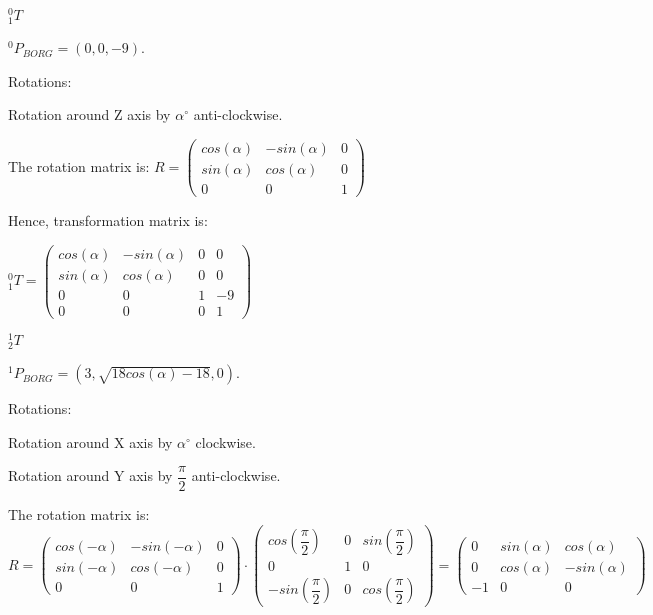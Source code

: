 \documentclass[12pt]{article}
\begin{document}
\begin{list}{)~}{}
\item
$_{1}^{0}T$

$^0 P_{BORG} = \left(0, 0, -9\right)$.

Rotations:

\begin{list}{)~}{}
\item
Rotation around Z axis by $\alpha^\circ$ anti-clockwise.
\end{list}

The rotation matrix is:
$R=\left(\begin{array}{ccc}
cos\left(\alpha\right) & -sin\left(\alpha\right) & 0 \\
sin\left(\alpha\right) & cos\left(\alpha\right) & 0\\
0 & 0 & 1\end{array}\right)$

Hence, transformation matrix is:

$_{1}^{0}T = \left(\begin{array}{cccc}
cos\left(\alpha\right) & - sin\left(\alpha\right) & 0 & 0 \\
sin\left(\alpha\right) & cos\left(\alpha\right) & 0 & 0\\
0 & 0 & 1 & -9\\
0 & 0 & 0 & 1\end{array}\right)$

\item
$_{2}^{1}T$

$^1 P_{BORG} = \left(3, \sqrt{18 cos(\alpha) - 18}, 0\right)$.

Rotations:

\begin{list}{)~}{}
\item Rotation around X axis by $\alpha^\circ$ clockwise.
\item Rotation around Y axis by $\dfrac{\pi}{2}$ anti-clockwise.
\end{list}

The rotation matrix is:
$R=\left(\begin{array}{ccc}
cos\left(-\alpha\right) & -sin\left(-\alpha\right) & 0 \\
sin\left(-\alpha\right) & cos\left(-\alpha\right) & 0\\
0 & 0 & 1\end{array}\right)\cdot
\left(\begin{array}{ccc}
cos \left(\dfrac{\pi}{2}\right) & 0 & sin \left(\dfrac{\pi}{2}\right) \\
0 & 1 & 0\\
-sin \left(\dfrac{\pi}{2}\right) & 0 & cos \left(\dfrac{\pi}{2}\right) \end{array}\right) =\left(\begin{array}{ccc}
0 & sin\left(\alpha\right) & cos\left(\alpha\right) \\
0 & cos\left(\alpha\right) & -sin\left(\alpha\right)\\
-1 & 0 & 0\end{array}\right)$


\end{list}
\end{document}
